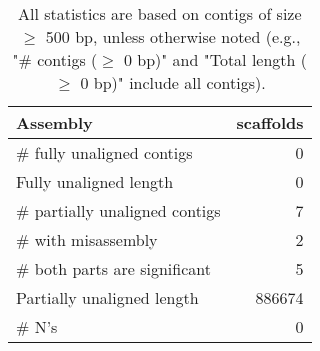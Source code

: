 \documentclass[12pt,a4paper]{article}
\begin{document}
\begin{table}[ht]
\begin{center}
\caption{All statistics are based on contigs of size $\geq$ 500 bp, unless otherwise noted (e.g., "\# contigs ($\geq$ 0 bp)" and "Total length ($\geq$ 0 bp)" include all contigs).}
\begin{tabular}{|l*{1}{|r}|}
\hline
Assembly & scaffolds \\ \hline
\# fully unaligned contigs & 0 \\ \hline
Fully unaligned length & 0 \\ \hline
\# partially unaligned contigs & 7 \\ \hline
\hspace{5mm}\# with misassembly & 2 \\ \hline
\hspace{5mm}\# both parts are significant & 5 \\ \hline
Partially unaligned length & 886674 \\ \hline
\# N's & 0 \\ \hline
\end{tabular}
\end{center}
\end{table}
\end{document}
